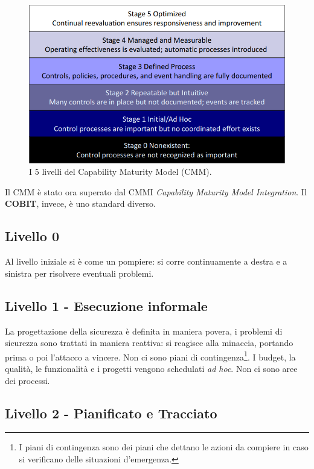 \begin{figure}[h!]
        \begin{center}
                \includegraphics[scale=2.0]{res/img/maturity_level}
        \end{center}
        \caption{I 5 livelli del Capability Maturity Model (CMM).}
        \label{fig:cmm:levels}
\end{figure}


Il CMM è stato ora superato dal CMMI \textit{Capability Maturity Model
Integration}. Il \textbf{COBIT}, invece, è uno standard diverso.


\subsection{Livello 0}

Al livello iniziale si è come un pompiere: si corre continuamente a destra e a
sinistra per risolvere eventuali problemi.

\subsection{Livello 1 - Esecuzione informale}

La progettazione della sicurezza è definita in maniera povera, i problemi di 
sicurezza sono trattati in maniera reattiva: si reagisce 
alla minaccia, portando prima o poi l'attacco a vincere. Non ci sono piani di 
contingenza\footnote{I piani di contingenza sono dei piani che dettano le 
azioni da compiere in caso si verificano delle situazioni d'emergenza.}. I 
budget, la qualità, le funzionalità e i progetti vengono schedulati \textit{ad 
hoc}. Non ci sono aree dei processi.

\subsection{Livello 2 - Pianificato e Tracciato}

